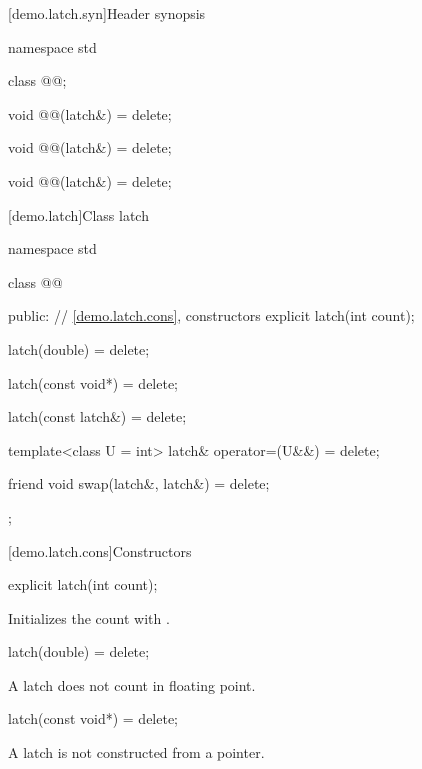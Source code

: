 [demo.latch.syn]{Header synopsis}

\begin{codeblock}
namespace std {
  class @@;

  void @@(latch&) = delete;

  void @@(latch&) = delete;

  void @@(latch&) = delete;
}
\end{codeblock}

[demo.latch]{Class latch}

\begin{codeblock}
namespace std {
  class @@ {
  public:
    // \ref{demo.latch.cons}, constructors
    explicit latch(int count);

    latch(double) = delete;

    latch(const void*) = delete;

    latch(const latch&) = delete;

    template<class U = int> latch& operator=(U&&) = delete;

    friend void swap(latch&, latch&) = delete;
  };
}
\end{codeblock}

[demo.latch.cons]{Constructors}

%
\begin{itemdecl}
explicit latch(int count);
\end{itemdecl}

\begin{itemdescr}
\pnum
\effects
Initializes the count with .
\end{itemdescr}

%
\begin{itemdecl}
latch(double) = delete;
\end{itemdecl}

\begin{itemdescr}
\pnum
\remarks
A latch does not count in floating point.
\end{itemdescr}

%
\begin{itemdecl}
latch(const void*) = delete;
\end{itemdecl}

\begin{itemdescr}
\pnum
\remarks
A latch is not constructed from a pointer.
\end{itemdescr}
